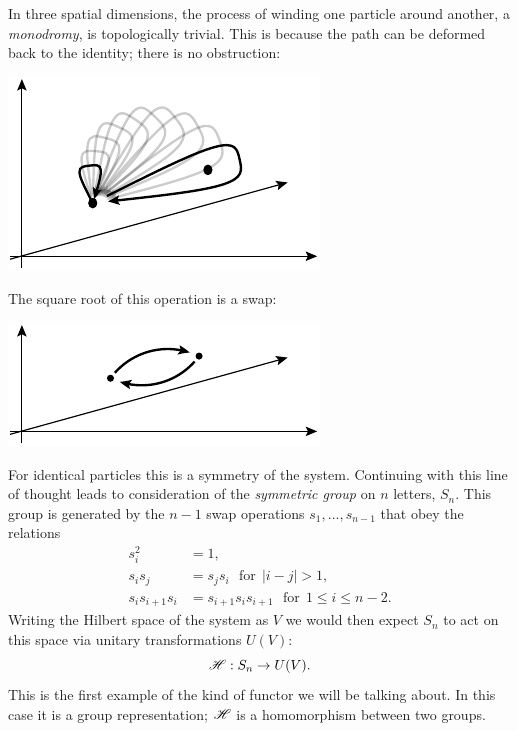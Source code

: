 \documentclass[aps, tightenlines, letterpaper, onecolumn, superscriptaddress, notitlepage, 11pt, groupedaddress]{revtex4-1}
\begin{document}
In three spatial dimensions, the process of winding one
particle around another, a \emph{monodromy}, is topologically trivial.
This is because the path can be deformed back to the
identity; there is no obstruction:
\begin{center}
\includegraphics[]{pic-monodromy3d.pdf}
\end{center}
The square root of this operation is a swap:
\begin{center}
\includegraphics[]{pic-swap.pdf}
\end{center}
For identical particles this is a symmetry of the system. 
Continuing with this line of thought 
leads to consideration of the \emph{symmetric group}
on $n$ letters, $S_n$. 
This group is generated by the $n-1$ swap operations
$s_1,...,s_{n-1}$ that obey the relations
\begin{align*}
    s_i^2 &= 1, \\
    s_i s_j &= s_j s_i \ \ \ \mbox{for}\ \ |i-j|>1,\\
    s_i s_{i+1} s_i &= s_{i+1} s_i s_{i+1} \ \ \ \mbox{for}\ \ 1\le i \le n-2.
\end{align*}
Writing the Hilbert space of the system as $V$ 
we would then expect $S_n$ to act on this space via unitary transformations $U(V):$
$$
    \mathscr{H} : S_n \to U(V).
$$
This is the first example of the kind of functor we will be talking about. 
In this case it is a group representation; $\mathscr{H}$ is a homomorphism between
two groups.
\end{document}
